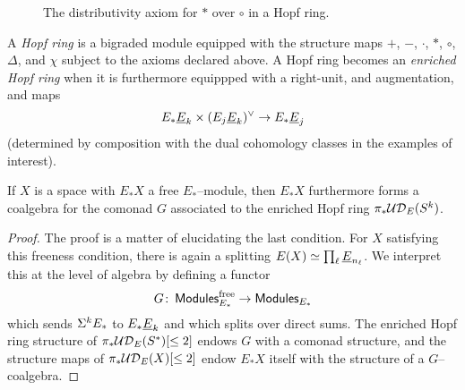 \begin{figure}
\begin{center}
\end{center}
\caption{The distributivity axiom for $\ast$ over $\circ$ in a Hopf ring.}\label{DistributivityDiagram}
\end{figure}

\begin{definition}
A \textit{Hopf ring} is a bigraded module equipped with the structure maps $+$, $-$, $\cdot$, $\ast$, $\circ$, $\Delta$, and $\chi$ subject to the axioms declared above.  A Hopf ring becomes an \textit{enriched Hopf ring} when it is furthermore equippped with a right-unit, and augmentation, and maps \[E_* \underline{\smash{E}}_{k} \times (E_j \underline{\smash{E}}_{k})^\vee \to E_* \underline{\smash{E}}_{j}\] (determined by composition with the dual cohomology classes in the examples of interest).
\end{definition}

\begin{lemma}\label{HopfRingFromOneRingSpectrum}
If $X$ is a space with $E_* X$ a free $E_*$--module, then $E_* X$ furthermore forms a coalgebra for the comonad $G$ associated to the enriched Hopf ring $\pi_* \mathcal{UD}_E(S^k)$.
\end{lemma}
\begin{proof}
The proof is a matter of elucidating the last condition.  For $X$ satisfying this freeness condition, there is again a splitting $E(X) \simeq \prod_\ell \underline{\smash{E}}_{n_\ell}$.  We interpret this at the level of algebra by defining a functor \[G\colon\thinspace \mathsf{Modules}_{E_*}^{\mathrm{free}} \to \mathsf{Modules}_{E_*}\] which sends $\Sigma^k E_*$ to $E_* \underline{\smash{E}}_{k}$ and which splits over direct sums.  The enriched Hopf ring structure of $\pi_* \mathcal{UD}_E(S^*)[\le 2]$ endows $G$ with a comonad structure, and the structure maps of $\pi_* \mathcal{UD}_E(X)[\le 2]$ endow $E_* X$ itself with the structure of a $G$--coalgebra.
\end{proof}

